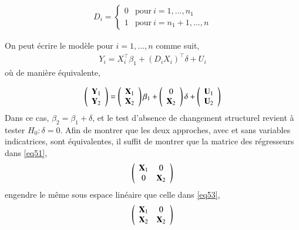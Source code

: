 \documentclass[10pt, reqno]{amsart}
\begin{document}
\begin{align*}
D_i = 
\left\{
\begin{array}{cl}
0& \textrm{pour} \ i = 1,...,n_1\\
1& \textrm{pour} \ i = n_1 + 1,...,n
\end{array}
\right.
\end{align*}

On peut écrire le modèle pour $i=1,...,n$ comme suit,
\begin{align*}
Y_i = X_i^\top\beta_1 + (D_iX_i)^\top\delta + U_i
\end{align*}
où de manière équivalente,

\begin{align}
\left(
\begin{array}{c}
\mathbf Y_1\\
\mathbf Y_2
\end{array}
\right)
=
\left(
\begin{array}{c}
\mathbf X_1\\
\mathbf X_2
\end{array}
\right)
\beta_1
+
\left(
\begin{array}{c}
0\\
\mathbf X_2
\end{array}
\right)
\delta
+
\left(
\begin{array}{c}
\mathbf U_1\\
\mathbf U_2
\end{array}
\right)
\label{eq53}
\end{align}
Dans ce cas, $\beta_2 = \beta_1+\delta$, et le test d'absence de changement structurel revient à tester $H_0:\delta = 0$. Afin de montrer que les deux approches, avec et sans variables indicatrices, sont équivalentes, il suffit de montrer que la matrice des régresseurs dans \eqref{eq51},
\begin{align*}
\left(
\begin{array}{cc}
\mathbf X_1&0\\
0&\mathbf X_2
\end{array}
\right)
\end{align*}
engendre le même sous espace linéaire que celle dans \eqref{eq53},
\begin{align*}
\left(
\begin{array}{cc}
\mathbf X_1&0\\
\mathbf X_2&\mathbf X_2
\end{array}
\right)
\end{align*}
\end{document}
